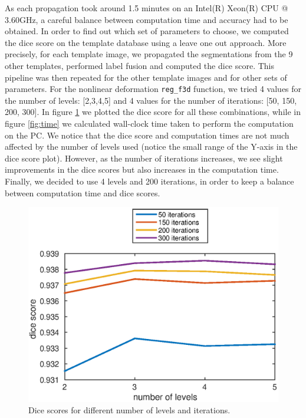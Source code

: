 \documentclass[11pt,a4paper,oneside]{report}
\begin{document}
As each propagation took around 1.5 minutes on an Intel(R) Xeon(R) CPU @ 3.60GHz, a careful balance between computation time and accuracy had to be obtained. In order to find out which set of parameters to choose, we computed the dice score on the template database using a leave one out approach. More precisely, for each template image, we propagated the segmentations from the 9 other templates, performed label fusion and computed the dice score. This pipeline was then repeated for the other template images and for other sets of parameters. For the nonlinear deformation \texttt{reg\_f3d} function, we tried 4 values for the number of levels: [2,3,4,5] and 4 values for the number of iterations: [50, 150, 200, 300]. In figure \ref{fig:dice} we plotted the dice score for all these combinations, while in figure \ref{fig:time} we calculated wall-clock time taken to perform the computation on the PC.
We notice that the dice score and computation times are not much affected by the number of levels used (notice the small range of the Y-axis in the dice score plot). However, as the number of iterations increases, we see slight improvements in the dice scores but also increases in the computation time. Finally, we decided to use 4 levels and 200 iterations, in order to keep a balance between computation time and dice scores.

\begin{figure}
 \centering
 \includegraphics[scale=0.8]{figures/dice_params.eps}
 \caption{Dice scores for different number of levels and iterations.}
 \label{fig:dice}
\end{figure}
\end{document}
